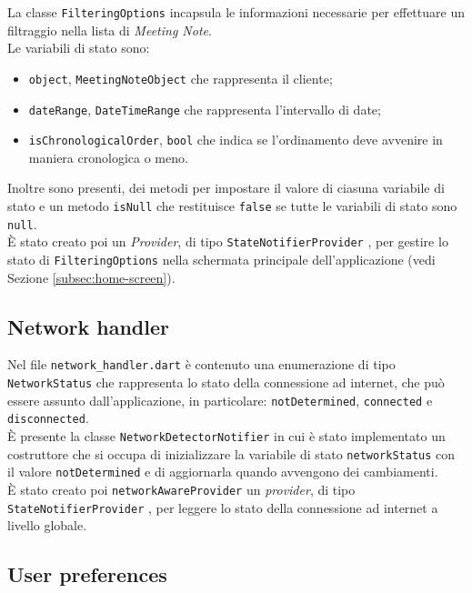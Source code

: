La classe \lstinline{FilteringOptions} incapsula le informazioni necessarie per effettuare un filtraggio nella lista di \emph{Meeting Note}.\\
Le variabili di stato sono:
\begin{itemize}
    \item \lstinline{object}, \lstinline{MeetingNoteObject} che rappresenta il \gls{cliente}\glsoccur;
    \item \lstinline{dateRange}, \lstinline{DateTimeRange} che rappresenta l'intervallo di date;
    \item \lstinline{isChronologicalOrder}, \lstinline{bool} che indica se l'ordinamento deve avvenire in maniera cronologica o meno.
\end{itemize}
Inoltre sono presenti, dei metodi per impostare il valore di ciasuna variabile di stato e un metodo \lstinline{isNull} che restituisce \lstinline{false} se tutte le variabili di stato sono \lstinline{null}. \\
È stato creato poi un \emph{Provider}, di tipo \lstinline{StateNotifierProvider} \cite{site:state-notifier-provider}, per gestire lo stato di \lstinline{FilteringOptions} nella schermata principale dell'applicazione (vedi Sezione \ref{subsec:home-screen}).

\subsection{Network handler}
\label{subsec:network-handler}

Nel file \lstinline{network_handler.dart} è contenuto una enumerazione di tipo \lstinline{NetworkStatus} che rappresenta lo stato della connessione ad internet, che può essere assunto dall'applicazione, in particolare: \lstinline{notDetermined}, \lstinline{connected} e \lstinline{disconnected}. \\
È presente la classe \lstinline{NetworkDetectorNotifier} in cui è stato implementato un costruttore che si occupa di inizializzare la variabile di stato \lstinline{networkStatus} con il valore \lstinline{notDetermined} e di aggiornarla quando avvengono dei cambiamenti. \\
È stato creato poi \lstinline{networkAwareProvider} un \emph{provider}, di tipo \lstinline{StateNotifierProvider} \cite{site:state-notifier-provider}, per leggere lo stato della connessione ad internet a livello globale.

\subsection{User preferences}
\label{subsec:shared-preferences}


